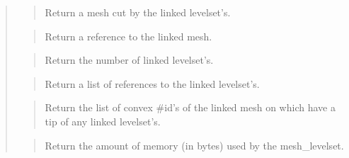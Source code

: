 \documentclass[a4paper,11pt,english]{sphinxmanual}
\begin{document}
\sphinxAtStartPar
{}
\begin{quote}

\sphinxAtStartPar
{}
\begin{quote}

\sphinxAtStartPar
Return a mesh cut by the linked levelset’s.
\end{quote}

\sphinxAtStartPar
{}
\begin{quote}

\sphinxAtStartPar
Return a reference to the linked mesh.
\end{quote}

\sphinxAtStartPar
{}
\begin{quote}

\sphinxAtStartPar
Return the number of linked levelset’s.
\end{quote}

\sphinxAtStartPar
{}
\begin{quote}

\sphinxAtStartPar
Return a list of references to the linked levelset’s.
\end{quote}

\sphinxAtStartPar
{}
\begin{quote}

\sphinxAtStartPar
Return the list of convex \#id’s of the linked mesh on
which have a tip of any linked levelset’s.
\end{quote}

\sphinxAtStartPar
{}
\begin{quote}

\sphinxAtStartPar
Return the amount of memory (in bytes) used by the mesh\_levelset.
\end{quote}

\sphinxAtStartPar
{}
\begin{quote}


\end{quote}
\end{quote}
\end{document}
